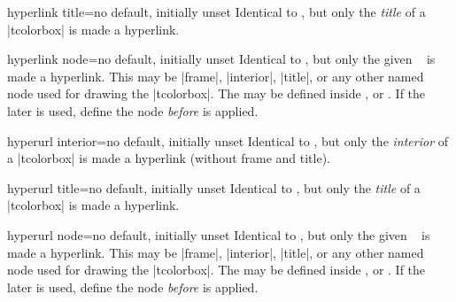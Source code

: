 \begin{docTcbKey}[][doc new=2017-02-03]{hyperlink title}{=}{no default, initially unset}
  Identical to , but only the \textit{title} of a
  |tcolorbox| is made a hyperlink.
\end{docTcbKey}

\begin{docTcbKey}[][doc new=2017-02-03]{hyperlink node}{=}{no default, initially unset}
  Identical to , but only the given \tikzname\ 
  is made a hyperlink. This  may be |frame|, |interior|, |title|, or
  any other named node used for drawing the |tcolorbox|.
  The  may be defined inside
  ,  or .
  If the later is used, define the node \emph{before} 
  is applied.
\end{docTcbKey}


\begin{docTcbKey}[][doc new=2017-02-03]{hyperurl interior}{=}{no default, initially unset}
  Identical to , but only the \textit{interior} of a
  |tcolorbox| is made a hyperlink (without frame and title).
\end{docTcbKey}

\begin{docTcbKey}[][doc new=2017-02-03]{hyperurl title}{=}{no default, initially unset}
  Identical to , but only the \textit{title} of a
  |tcolorbox| is made a hyperlink.
\end{docTcbKey}

\begin{docTcbKey}[][doc new=2017-02-03]{hyperurl node}{=}{no default, initially unset}
  Identical to , but only the given \tikzname\ 
  is made a hyperlink. This  may be |frame|, |interior|, |title|, or
  any other named node used for drawing the |tcolorbox|.
  The  may be defined inside
  ,  or .
  If the later is used, define the node \emph{before} 
  is applied.
\end{docTcbKey}


